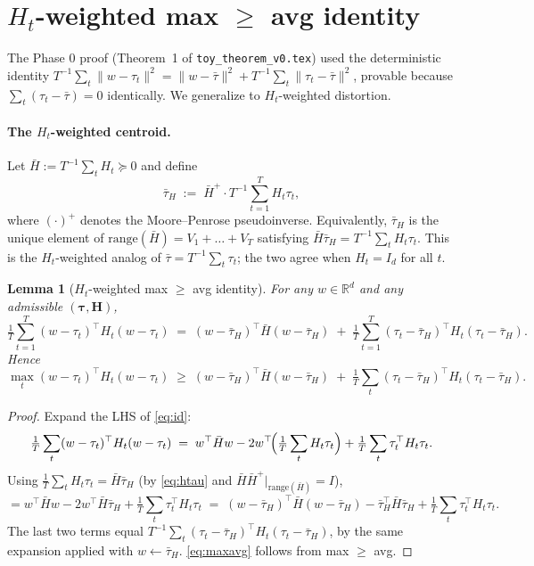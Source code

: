 \documentclass{article}
\newtheorem{lemma}[theorem]{Lemma}
\theoremstyle{remark}
\newcommand{\R}{\mathbb{R}}
\newcommand{\range}{\mathrm{range}}
\newcommand{\tauH}{\bar\tau_{H}}
\newcommand{\Hbar}{\bar H}
\newcommand{\hpinv}{^{+}}
\begin{document}
\section{$H_t$-weighted max $\geq$ avg identity}\label{sec:id}

The Phase 0 proof (Theorem~1 of \texttt{toy\_theorem\_v0.tex}) used
the deterministic identity
$T^{-1}\sum_t\|w - \tau_t\|^2 = \|w - \bar\tau\|^2 + T^{-1}\sum_t
\|\tau_t - \bar\tau\|^2$, provable because $\sum_t(\tau_t-\bar\tau) = 0$
identically. We generalize to $H_t$-weighted distortion.

\paragraph{The $H_t$-weighted centroid.} Let
$\Hbar := T^{-1}\sum_t H_t \succeq 0$ and define
\begin{equation}\label{eq:htau}
  \tauH \;:=\; \Hbar\hpinv \cdot T^{-1}\sum_{t=1}^T H_t \tau_t,
\end{equation}
where $(\cdot)\hpinv$ denotes the Moore--Penrose pseudoinverse.
Equivalently, $\tauH$ is the unique element of
$\range(\Hbar) = V_1 + \dots + V_T$ satisfying $\Hbar \tauH =
T^{-1}\sum_t H_t\tau_t$. This is the $H_t$-weighted analog of
$\bar\tau = T^{-1}\sum_t\tau_t$; the two agree when $H_t = I_d$ for
all $t$.

\begin{lemma}[$H_t$-weighted max $\geq$ avg identity]\label{lem:id}
For any $w \in \R^d$ and any admissible $(\boldsymbol\tau,
\boldsymbol H)$,
\begin{equation}\label{eq:id}
  \tfrac{1}{T}\sum_{t=1}^T (w-\tau_t)^\top H_t (w-\tau_t)
  \;=\; (w - \tauH)^\top\Hbar(w-\tauH)
  \;+\; \tfrac{1}{T}\sum_{t=1}^T (\tau_t-\tauH)^\top H_t (\tau_t-\tauH).
\end{equation}
Hence
\begin{equation}\label{eq:maxavg}
  \max_t (w-\tau_t)^\top H_t (w-\tau_t)
  \;\geq\; (w - \tauH)^\top\Hbar(w-\tauH)
  \;+\; \tfrac{1}{T}\sum_t (\tau_t-\tauH)^\top H_t (\tau_t-\tauH).
\end{equation}
\end{lemma}

\begin{proof}
Expand the LHS of \eqref{eq:id}:
\[
  \tfrac1T\sum_t (w-\tau_t)^\top H_t (w-\tau_t)
  \;=\; w^\top \Hbar w - 2 w^\top\!\Bigl(\tfrac1T\sum_t H_t\tau_t\Bigr)
    + \tfrac1T\sum_t \tau_t^\top H_t \tau_t.
\]
Using $\tfrac1T\sum_t H_t\tau_t = \Hbar\tauH$ (by
\eqref{eq:htau} and $\Hbar\Hbar\hpinv|_{\range(\Hbar)} = I$),
\[
  = w^\top\Hbar w - 2 w^\top\Hbar\tauH + \tfrac1T\sum_t\tau_t^\top H_t \tau_t
  \;=\; (w-\tauH)^\top\Hbar(w-\tauH) - \tauH^\top\Hbar\tauH +
    \tfrac1T\sum_t\tau_t^\top H_t\tau_t.
\]
The last two terms equal $T^{-1}\sum_t(\tau_t - \tauH)^\top H_t
(\tau_t-\tauH)$, by the same expansion applied with $w\leftarrow\tauH$.
\eqref{eq:maxavg} follows from max $\geq$ avg.
\end{proof}
\end{document}

